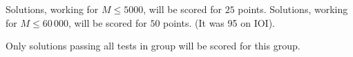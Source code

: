 Solutions, working for $M \le 5000$, will be scored for $25$ points.
Solutions, working for $M \le 60\,000$, will be scored for $50$ points. (It was 95 on IOI). 

Only solutions passing all tests in group will be scored for this group.
